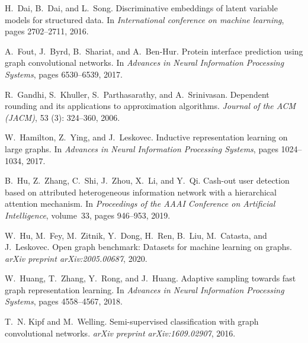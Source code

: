 \documentclass{article}
\begin{document}
\begin{thebibliography}{25}
H.~Dai, B.~Dai, and L.~Song.
\newblock Discriminative embeddings of latent variable models for structured
  data.
\newblock In \emph{International conference on machine learning}, pages
  2702--2711, 2016.

A.~Fout, J.~Byrd, B.~Shariat, and A.~Ben-Hur.
\newblock Protein interface prediction using graph convolutional networks.
\newblock In \emph{Advances in Neural Information Processing Systems}, pages
  6530--6539, 2017.

R.~Gandhi, S.~Khuller, S.~Parthasarathy, and A.~Srinivasan.
\newblock Dependent rounding and its applications to approximation algorithms.
\newblock \emph{Journal of the ACM (JACM)}, 53 (3): 324--360,
  2006.

W.~Hamilton, Z.~Ying, and J.~Leskovec.
\newblock Inductive representation learning on large graphs.
\newblock In \emph{Advances in Neural Information Processing Systems}, pages
  1024--1034, 2017.

B.~Hu, Z.~Zhang, C.~Shi, J.~Zhou, X.~Li, and Y.~Qi.
\newblock Cash-out user detection based on attributed heterogeneous information
  network with a hierarchical attention mechanism.
\newblock In \emph{Proceedings of the AAAI Conference on Artificial
  Intelligence}, volume~33, pages 946--953, 2019.

W.~Hu, M.~Fey, M.~Zitnik, Y.~Dong, H.~Ren, B.~Liu, M.~Catasta, and J.~Leskovec.
\newblock Open graph benchmark: Datasets for machine learning on graphs.
\newblock \emph{arXiv preprint arXiv:2005.00687}, 2020.

W.~Huang, T.~Zhang, Y.~Rong, and J.~Huang.
\newblock Adaptive sampling towards fast graph representation learning.
\newblock In \emph{Advances in Neural Information Processing Systems}, pages
  4558--4567, 2018.

T.~N. Kipf and M.~Welling.
\newblock Semi-supervised classification with graph convolutional networks.
\newblock \emph{arXiv preprint arXiv:1609.02907}, 2016.


\end{thebibliography}
\end{document}

